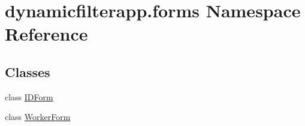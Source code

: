 \hypertarget{namespacedynamicfilterapp_1_1forms}{}\section{dynamicfilterapp.\+forms Namespace Reference}
\label{namespacedynamicfilterapp_1_1forms}
\subsection*{Classes}
\begin{DoxyCompactItemize}
\item 
class \mbox{\hyperlink{classdynamicfilterapp_1_1forms_1_1_i_d_form}{I\+D\+Form}}
\item 
class \mbox{\hyperlink{classdynamicfilterapp_1_1forms_1_1_worker_form}{Worker\+Form}}
\end{DoxyCompactItemize}
